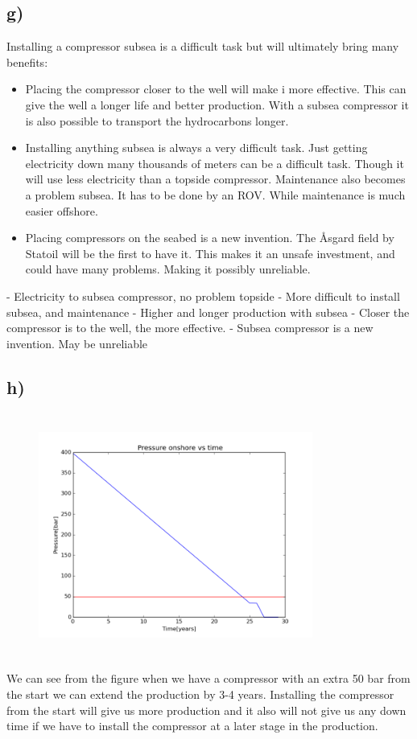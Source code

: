 \documentclass[DIV=calc, paper=a4, fontsize=13pt, twocolumn]{scrartcl}	 %
\begin{document}
\subsection*{g)}
Installing a compressor subsea is a difficult task but will ultimately bring many benefits:
\begin{itemize}
\item Placing the compressor closer to the well will make i more effective. This can give the well a longer life and better production. With a subsea compressor it is also possible to transport the hydrocarbons longer.
\item Installing anything subsea is always a very difficult task. Just getting electricity down many thousands of meters can be a difficult task. Though it will use less electricity than a topside compressor. Maintenance also becomes a problem subsea. It has to be done by an ROV. While maintenance is much easier offshore.
\item Placing compressors on the seabed is a new invention. The Åsgard field by Statoil will be the first to have it. This makes it an unsafe investment, and could have many problems. Making it possibly unreliable.

\end{itemize}
- Electricity to subsea compressor, no problem topside
- More difficult to install subsea, and maintenance 
- Higher and longer production with subsea
- Closer the compressor is to the well, the more effective.
- Subsea compressor is a new invention. May be unreliable

\subsection*{h)}
\begin{figure}[h]
\includegraphics[width=9cm,height=8cm]{Pressure_compressor.png}
\end{figure}
We can see from the figure when we have a compressor with an extra 50 bar from the start we can extend the production by 3-4 years. Installing the compressor from the start will give us more production and it also will not give us any down time if we have to install the compressor at a later stage in the production. 
\end{document}
